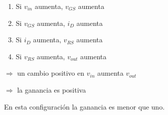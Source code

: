 \begin{frame}[t]
\begin{columns}
\begin{column}{0.6\textwidth}
            \begin{enumerate}
                \item Si $v_{in}$ aumenta, $v_{GS}$ aumenta
                \item Si $v_{GS}$ aumenta, $i_D$ aumenta
                \item Si $i_D$ aumenta, $v_{RS}$ aumenta
                \item Si $v_{RS}$ aumenta, $v_{out}$ aumenta
            \end{enumerate}

            $\Rightarrow$ un cambio positivo en $v_{in}$ aumenta $v_{out}$

            $\Rightarrow$ la ganancia es positiva

            \vspace{5mm}
            En esta configuración la ganancia es menor que uno.
        \end{column}
    \end{columns}
\end{frame}



